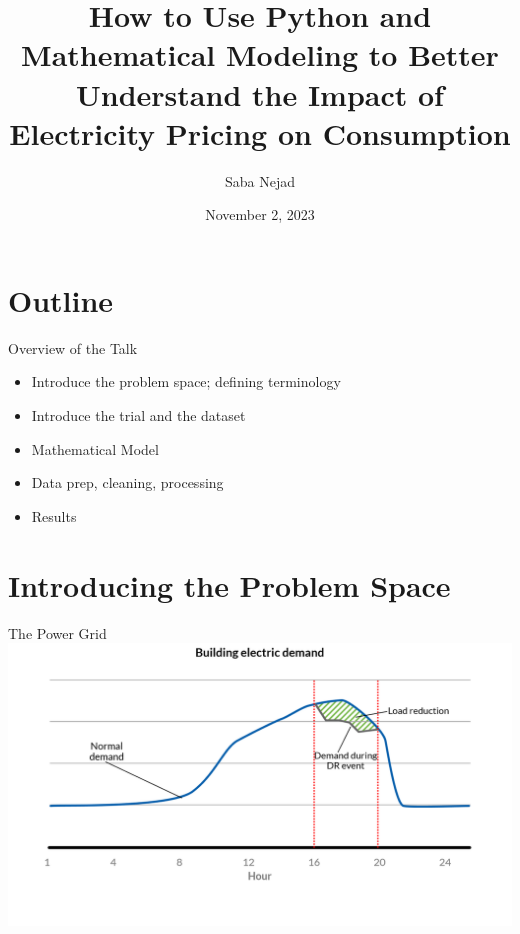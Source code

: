 \documentclass{beamer}
\title{How to Use Python and Mathematical Modeling to Better Understand the Impact of Electricity Pricing on Consumption}
\date{November 2, 2023}
\author{Saba Nejad}
\institute{PyData NYC 2023}
\begin{document}
\maketitle

\section{Outline}

\begin{frame}{Overview of the Talk}
  \begin{itemize}
  \item Introduce the problem space; defining terminology
  \item Introduce the trial and the dataset
  \item Mathematical Model
  \item Data prep, cleaning, processing
  \item Results
  \end{itemize}
\end{frame}

\section{Introducing the Problem Space}

\begin{frame}{The Power Grid}
  \includegraphics[width=1.00\textwidth]{images/demand-response.png}
\end{frame}
\end{document}

